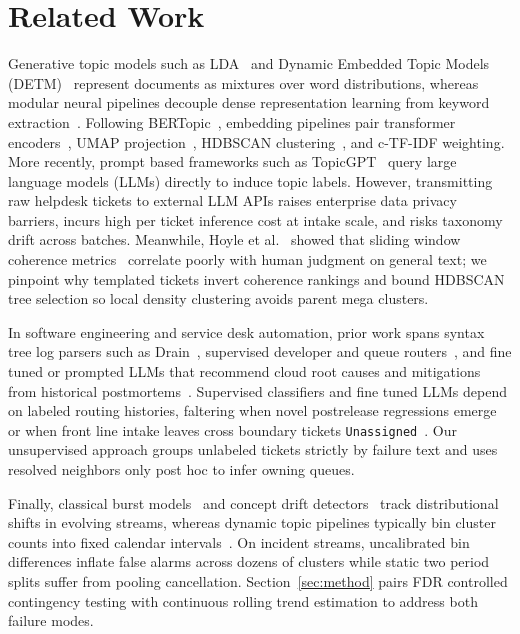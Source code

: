 \documentclass[sigconf,nonacm,pbalance]{acmart}
\begin{document}
\section{Related Work}
Generative topic models such as LDA~\cite{blei2003latent} and Dynamic Embedded Topic Models (DETM)~\cite{dieng2020dynamic} represent documents as mixtures over word distributions, whereas modular neural pipelines decouple dense representation learning from keyword extraction~\cite{sia2020tired, bianchi2021pre, grootendorst2022bertopic}. Following BERTopic~\cite{grootendorst2022bertopic}, embedding pipelines pair transformer encoders~\cite{reimers2019sentence, wang2020minilm}, UMAP projection~\cite{mcinnes2018umap}, HDBSCAN clustering~\cite{campello2013density, mcinnes2017hdbscan}, and c-TF-IDF weighting. More recently, prompt based frameworks such as TopicGPT~\cite{pham2024topicgpt} query large language models (LLMs) directly to induce topic labels. However, transmitting raw helpdesk tickets to external LLM APIs raises enterprise data privacy barriers, incurs high per ticket inference cost at intake scale, and risks taxonomy drift across batches. Meanwhile, Hoyle et al.~\cite{hoyle2021automated} showed that sliding window coherence metrics~\cite{newman2010automatic, roder2015exploring} correlate poorly with human judgment on general text; we pinpoint why templated tickets invert coherence rankings and bound HDBSCAN tree selection so local density clustering avoids parent mega clusters.

In software engineering and service desk automation, prior work spans syntax tree log parsers such as Drain~\cite{he2017drain}, supervised developer and queue routers~\cite{anvik2006who, agarwal2012identifying, chen2020incidental}, and fine tuned or prompted LLMs that recommend cloud root causes and mitigations from historical postmortems~\cite{ahmed2023recommending}. Supervised classifiers and fine tuned LLMs depend on labeled routing histories, faltering when novel postrelease regressions emerge or when front line intake leaves cross boundary tickets \texttt{Unassigned}~\cite{chen2020incidental}. Our unsupervised approach groups unlabeled tickets strictly by failure text and uses resolved neighbors only post hoc to infer owning queues.

Finally, classical burst models~\cite{kleinberg2002bursty} and concept drift detectors~\cite{gama2014survey} track distributional shifts in evolving streams, whereas dynamic topic pipelines typically bin cluster counts into fixed calendar intervals~\cite{dieng2020dynamic, grootendorst2022bertopic}. On incident streams, uncalibrated bin differences inflate false alarms across dozens of clusters while static two period splits suffer from pooling cancellation. Section~\ref{sec:method} pairs FDR controlled contingency testing with continuous rolling trend estimation to address both failure modes.
\end{document}
